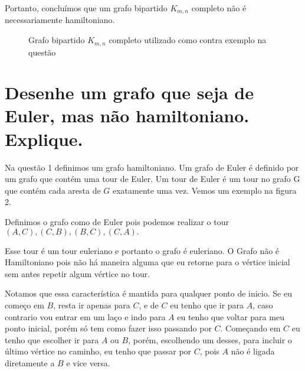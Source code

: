 \documentclass[a4paper,12pt]{article}
\begin{document}
	Portanto, concluímos que um grafo bipartido $K_{m,n}$ completo não é necessariamente hamiltoniano.

	\begin{figure}[!ht]
		\centering
		\caption{Grafo bipartido $K_{m,n}$ completo utilizado como contra exemplo na questão \thesection}
	\end{figure}

\section{Desenhe um grafo que seja de Euler, mas não hamiltoniano. Explique.}
	Na questão 1 definimos um grafo hamiltoniano. Um grafo de Euler é definido por um grafo que contém uma tour de Euler. Um tour de Euler é um tour no grafo G que contém cada aresta de $G$ exatamente uma vez. Vemos um exemplo na figura 2.

	Definimos o grafo como de Euler pois podemos realizar o tour $(A,C),(C,B),(B,C),(C,A).$

	Esse tour é um tour euleriano e portanto o grafo é euleriano. O Grafo não é Hamiltoniano pois não há maneira alguma que eu retorne para o vértice inicial sem antes repetir algum vértice no tour.

	Notamos que essa característica é mantida para qualquer ponto de inicio. Se eu começo em $B$, resta ir apenas para $C$, e de $C$ eu tenho que ir para $A$, caso contrario vou entrar em um laço e indo para $A$ eu tenho que voltar para meu ponto inicial, porém só tem como fazer isso passando por $C$. Começando em $C$ eu tenho que escolher ir para $A$ ou $B$, porém, escolhendo um desses, para incluir o último vértice no caminho, eu tenho que passar por $C$, pois $A$ não é ligada diretamente a $B$ e vice versa.
\end{document}
